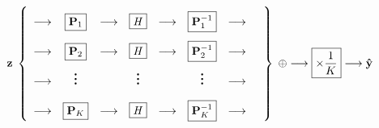\begin{equation}
	\z\;\left\{
	\def\arraystretch{2.2}
	\begin{array}{ccccccccc}
		\longrightarrow & \boxed{\P_1} & \longrightarrow & \boxed{\H} & \longrightarrow & \boxed{\P_1^{-1}} & \longrightarrow \\
		\longrightarrow & \boxed{\P_2} & \longrightarrow & \boxed{\H} & \longrightarrow & \boxed{\P_2^{-1}} & \longrightarrow \\
		\longrightarrow & \huge\vdots &  & \huge\vdots &  & \huge\vdots & \longrightarrow & \\
		\longrightarrow & \boxed{\P_K} & \longrightarrow & \boxed{\H} & \longrightarrow & \boxed{\P_K^{-1}} & \longrightarrow
	\end{array}
	\right\}\;\oplus\longrightarrow\boxed{\times\frac{1}{K}}\longrightarrow\yhat
\end{equation}

%	


